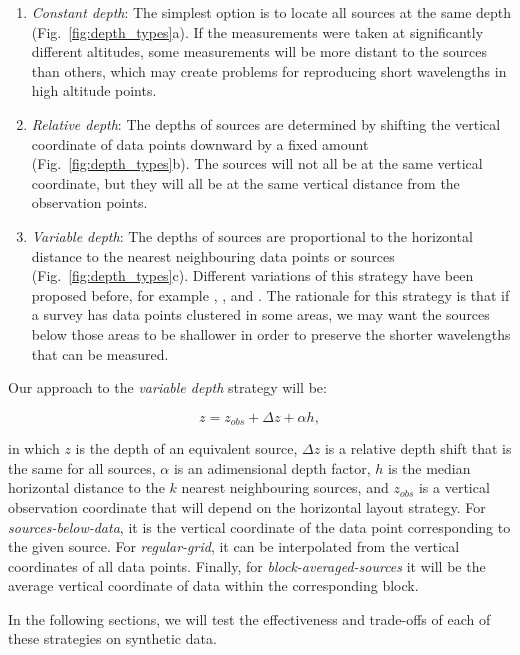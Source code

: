 \documentclass[twocolumn]{article}
\begin{document}
\begin{enumerate}
  \item
    \emph{Constant depth}:
    The simplest option is to locate all sources at the same depth
    (Fig.~\ref{fig:depth_types}a).
    If the measurements were taken at significantly different altitudes, some
    measurements will be more distant to the sources than others,
    which may create problems for reproducing short wavelengths in high
    altitude points.
 \item
    \emph{Relative depth}:
    The depths of sources are determined by shifting the vertical coordinate of
    data points downward by a fixed amount (Fig.~\ref{fig:depth_types}b).
    The sources will not all be at the same vertical coordinate, but they will
    all be at the same vertical distance from the observation points.
 \item
    \emph{Variable depth}:
    The depths of sources are proportional to the horizontal distance to the
    nearest neighbouring data points or sources (Fig.~\ref{fig:depth_types}c).
    Different variations of this strategy have been proposed before, for
    example \citet{cordell1992}, \citet{guspi2004}, and \citet{guspi2009}.
    The rationale for this strategy is that if a survey has data points
    clustered in some areas, we may
    want the sources below those areas to be shallower in order to preserve the
    shorter wavelengths that can be measured.
\end{enumerate}

Our approach to the \emph{variable depth} strategy will be:

\begin{equation}
  z = z_{obs} + \Delta z + \alpha h,
\end{equation}

\noindent
in which $z$ is the depth of an equivalent source,
$\Delta z$ is a relative depth shift that is the same for all sources,
$\alpha$ is an adimensional depth factor,
$h$ is the median horizontal distance to the $k$ nearest neighbouring sources,
and
$z_{obs}$ is a vertical observation coordinate that will depend on the
horizontal layout strategy.
For \emph{sources-below-data}, it is the vertical coordinate of the data point
corresponding to the given source.
For \emph{regular-grid}, it can be interpolated from the vertical coordinates
of all data points.
Finally, for \emph{block-averaged-sources} it will be the average vertical
coordinate of data within the corresponding block.

In the following sections, we will test the effectiveness and trade-offs of
each of these strategies on synthetic data.
\end{document}
